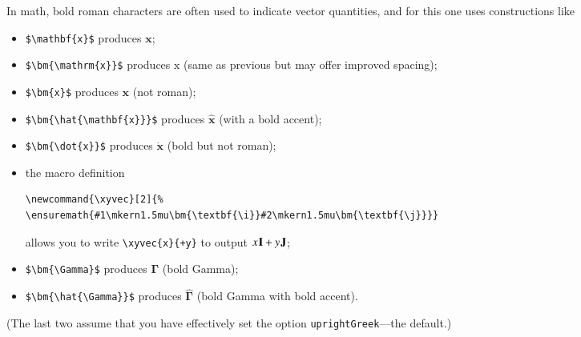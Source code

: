 \documentclass[11pt]{article}
\theoremstyle{oldplain}
\theoremstyle{plain}
\begin{document}
In math, bold roman characters are often used to indicate vector quantities, and for this one uses constructions like 
\begin{itemize}
\item
\verb|$\mathbf{x}$| produces $\mathbf{x}$;
\item
\verb|$\bm{\mathrm{x}}$| produces $\bm{\mathrm{x}}$ (same as previous but may offer improved spacing);
\item
\verb|$\bm{x}$| produces $\bm{x}$ (not roman);
\item
\verb|$\bm{\hat{\mathbf{x}}}$| produces $\bm{\hat{\mathbf{x}}}$ (with a bold accent);
\item \verb|$\bm{\dot{x}}$| produces $\bm{\dot{x}}$ (bold but not roman);
\item the macro definition
\begin{verbatim}
\newcommand{\xyvec}[2]{%
\ensuremath{#1\mkern1.5mu\bm{\textbf{\i}}#2\mkern1.5mu\bm{\textbf{\j}}}}
\end{verbatim}
allows you to write \verb|\xyvec{x}{+y}| to output $\xyvec{x}{+y}$;
\item \verb|$\bm{\Gamma}$| produces $\bm{\Gamma}$ (bold Gamma);
\item \verb|$\bm{\hat{\Gamma}}$| produces $\bm{\hat{\Gamma}}$ (bold Gamma with bold accent).
\end{itemize}
(The last two assume that you have effectively set the option {\tt uprightGreek}---the default.)
\end{document}
